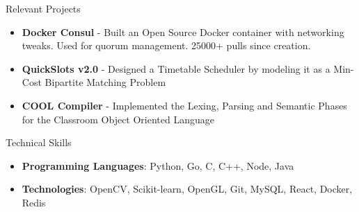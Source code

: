 \documentclass{resume}
\begin{document}
\begin{rSection}{Relevant Projects}
  \begin{itemize}[label={},topsep=0pt,itemsep=-0.5ex,partopsep=1ex,parsep=1ex,leftmargin=0.25em]
  \item  {\bf Docker Consul} - Built an Open Source Docker container with networking tweaks. Used for quorum management. 25000+ pulls since creation.
  \item {\bf QuickSlots v2.0} - Designed a Timetable Scheduler by modeling it as a Min-Cost Bipartite Matching Problem
  \item {\bf COOL Compiler} - Implemented the Lexing, Parsing and Semantic Phases for the Classroom Object Oriented Language
  \end{itemize}
\end{rSection}

\begin{rSection}{Technical Skills}

  \begin{itemize}[label={},topsep=0pt,itemsep=-0.5ex,partopsep=1ex,parsep=1ex,leftmargin=0.25em]
  \item  {\bf Programming Languages}: Python, Go, C, C++, Node, Java
  \item {\bf Technologies}: OpenCV, Scikit-learn, OpenGL, Git, MySQL, React, Docker, Redis
  \end{itemize}

\end{rSection}
\end{document}
